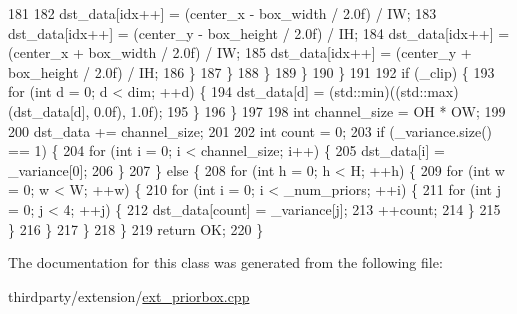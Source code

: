 \begin{DoxyCode}
181 
182                             dst\_data[idx++] = (center\_x - box\_width / 2.0f) / IW;
183                             dst\_data[idx++] = (center\_y - box\_height / 2.0f) / IH;
184                             dst\_data[idx++] = (center\_x + box\_width / 2.0f) / IW;
185                             dst\_data[idx++] = (center\_y + box\_height / 2.0f) / IH;
186                         \}
187                     \}
188                 \}
189             \}
190         \}
191 
192         \textcolor{keywordflow}{if} (\_clip) \{
193             \textcolor{keywordflow}{for} (\textcolor{keywordtype}{int} d = 0; d < dim; ++d) \{
194                 dst\_data[d] = (std::min)((std::max)(dst\_data[d], 0.0f), 1.0f);
195             \}
196         \}
197 
198         \textcolor{keywordtype}{int} channel\_size = OH * OW;
199 
200         dst\_data += channel\_size;
201 
202         \textcolor{keywordtype}{int} count = 0;
203         \textcolor{keywordflow}{if} (\_variance.size() == 1) \{
204             \textcolor{keywordflow}{for} (\textcolor{keywordtype}{int} i = 0; i < channel\_size; i++) \{
205                 dst\_data[i] = \_variance[0];
206             \}
207         \} \textcolor{keywordflow}{else} \{
208             \textcolor{keywordflow}{for} (\textcolor{keywordtype}{int} h = 0; h < H; ++h) \{
209                 \textcolor{keywordflow}{for} (\textcolor{keywordtype}{int} w = 0; w < W; ++w) \{
210                     \textcolor{keywordflow}{for} (\textcolor{keywordtype}{int} i = 0; i < \_num\_priors; ++i) \{
211                         \textcolor{keywordflow}{for} (\textcolor{keywordtype}{int} j = 0; j < 4; ++j) \{
212                             dst\_data[count] = \_variance[j];
213                             ++count;
214                         \}
215                     \}
216                 \}
217             \}
218         \}
219         \textcolor{keywordflow}{return} OK;
220     \}
\end{DoxyCode}


The documentation for this class was generated from the following file\+:\begin{DoxyCompactItemize}
\item 
thirdparty/extension/\hyperlink{ext__priorbox_8cpp}{ext\+\_\+priorbox.\+cpp}\end{DoxyCompactItemize}

